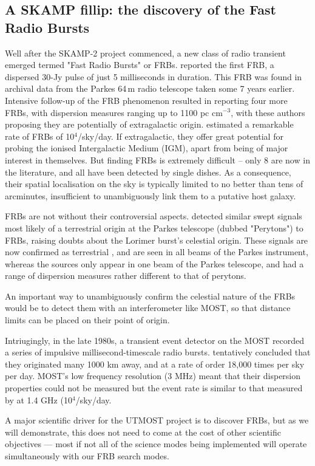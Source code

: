 \subsection{A SKAMP fillip: the discovery of the Fast Radio Bursts}

Well after the SKAMP-2 project commenced, a new class of radio transient emerged termed "Fast Radio Bursts" or FRBs. \cite{Lorimer_2007} reported the first FRB, a dispersed 30-Jy pulse of just 5 milliseconds in duration. This FRB was found in archival data from the Parkes 64\,m radio telescope taken some 7 years earlier. Intensive follow-up of the FRB phenomenon resulted in \citep{Thornton_2013} reporting four more FRBs, with dispersion measures ranging up to 1100 pc cm$^{-3}$, with these authors proposing they are potentially of extragalactic origin. \citep{Thornton_2013} estimated a remarkable rate of FRBs of 10$^4$/sky/day. If extragalactic, they offer great potential for probing the ionised Intergalactic Medium (IGM), apart from being of major interest in themselves. But finding FRBs is extremely difficult \cite{Keane_2012} -- only 8 are now in the literature, and all have been detected by single dishes. As a consequence, their spatial localisation on the sky is typically limited to no better than tens of arcminutes, insufficient to unambiguously link them to a putative host galaxy. 

FRBs are not without their controversial aspects. \cite{Burke_Spolaor_2011} detected similar swept signals most likely of a terrestrial origin at the Parkes telescope (dubbed "Perytons") to FRBs, raising doubts about the Lorimer burst's celestial origin. These signals are now confirmed as terrestrial \cite{2015arXiv150402165P}, and are seen in all beams of the Parkes instrument, whereas the \cite{Thornton_2013} sources only appear in one beam of the Parkes telescope, and had a range of dispersion measures rather different to that of perytons.

An important way to unambiguously confirm the celestial nature of the FRBs would be to detect them with an interferometer like MOST, so that distance limits can be placed on their point of origin.

Intriugingly, in the late 1980s, a transient event detector on the MOST recorded a series of impulsive millisecond-timescale radio bursts. \cite{AMY} tentatively concluded that they originated many 1000 km away, and at a rate of order 18,000 times per sky per day. MOST's low frequency resolution (3 MHz) meant that their dispersion properties could not be measured but the event rate is similar to that measured by \citep{Thornton_2013} at 1.4 GHz (10$^4$/sky/day. 

A major scientific driver for the UTMOST project is to discover FRBs, but as we will demonstrate, this does not need to come at the cost of other scientific objectives --- most if not all of the science modes being implemented will operate simultaneously with our FRB search modes.
    
    
